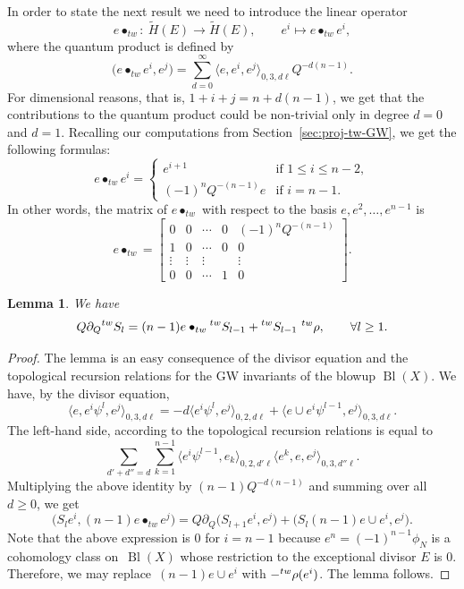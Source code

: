 \documentclass[pdftex]{sigma}
\numberwithin{equation}{section}
\newtheorem{Lemma}[Theorem]{Lemma}
\newcommand{\leftexp}[2]{{\vphantom{#2}}^{#1}{#2}}
\begin{document}
In order to state the next result we need to introduce the linear
operator
\[
e\bullet_{tw}\colon\ \widetilde{H}(E)\to \widetilde{H}(E),\qquad
e^i\mapsto e\bullet_{tw} e^i,
\]
where the quantum product is defined by
\[
\big(e\bullet_{tw} e^i,e^j\big) =
\sum_{d=0}^\infty
\big\langle e, e^i, e^j\big\rangle_{0,3,d\ell}
Q^{-d(n-1)}.
\]
For dimensional reasons, that is, $1+i+j= n+d(n-1)$, we get that the
contributions to the quantum product could be non-trivial only in
degree $d=0$ and $d=1$. Recalling our computations from Section~\ref{sec:proj-tw-GW}, we get the following formulas:
\[
e\bullet_{tw} e^i =
\begin{cases}
e^{i+1} & \mbox{if } 1\leq i\leq n-2, \\
(-1)^n Q^{-(n-1)} e & \mbox{if } i=n-1.
\end{cases}
\]
In other words, the matrix of $e\bullet_{tw}$ with respect to the
basis $e,e^2,\dots,e^{n-1}$ is
\[
e\bullet_{tw} =
\begin{bmatrix}
0 & 0 & \cdots & 0 & (-1)^n Q^{-(n-1)} \\
1 & 0 & \cdots & 0 & 0 \\
\vdots & \vdots &\vdots & & \vdots \\
0 & 0 & \cdots & 1 & 0
\end{bmatrix}.
\]
\begin{Lemma}\label{le:tw-period-div_eq}
We have
\[
Q\partial_Q
\leftexp{tw}{S}_l = (n-1) e\bullet_{tw}
\leftexp{tw}{S}_{l-1}+
\leftexp{tw}{S}_{l-1} \
\leftexp{tw}{\rho}, \qquad \forall l\geq 1.
\]
\end{Lemma}
\begin{proof}
The lemma is an easy consequence of the divisor equation and the
topological recursion relations for the GW invariants of the blowup $\operatorname{Bl}(X)$. We have, by the divisor equation,
\[
\big\langle e, e^i \psi^l, e^j\big\rangle_{0,3,d\ell} =
-d \big\langle e^i \psi^l, e^j\big\rangle_{0,2,d\ell} +
\big\langle e\cup e^{i} \psi^{l-1}, e^j\big\rangle_{0,3,d\ell}.
\]
The left-hand side, according to the topological recursion relations is equal to
\[
\sum_{d'+d''=d}
\sum_{k=1}^{n-1}
\big\langle e^i \psi^{l-1}, e_k\big\rangle_{0,2,d'\ell}
\big\langle e^k, e,e^j\big\rangle_{0,3,d''\ell}.
\]
Multiplying the above identity by $(n-1) Q^{-d(n-1)}$ and summing over
all $d\geq 0$, we get
\[
\big(S_l e^i, (n-1)e\bullet_{tw} e^j\big) = Q\partial_Q \big(S_{l+1} e^i,e^j\big)+
\big(S_l (n-1)e\cup e^i, e^j\big).
\]
Note that the above expression is 0 for $i=n-1$ because
$e^n=(-1)^{n-1}\phi_N$ is a cohomology class on~$\operatorname{Bl}(X)$ whose
restriction to the exceptional divisor $E$ is $0$. Therefore, we may
replace~${(n-1)e\cup e^i}$ with $-\leftexp{tw}{\rho}(e^i)$. The lemma
follows. \end{proof}
\end{document}
